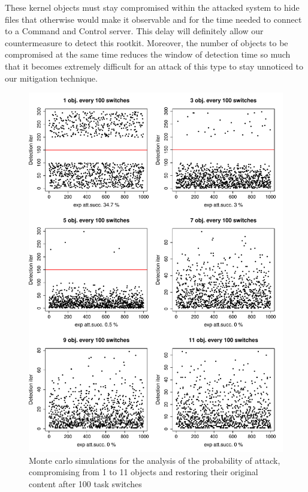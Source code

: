 These kernel objects must stay compromised within the attacked system to hide files that otherwise would make it observable and for the time needed to connect to a Command and Control server. 
This delay will definitely allow our countermeasure to detect this rootkit. Moreover, the number of objects to be compromised at the same time reduces the window of detection time so much that it becomes extremely difficult for an attack of this type to stay unnoticed to our mitigation technique.



\begin{figure}[!htbp]
\begin{center}
\includegraphics[width=130mm]{images/hr_sim_1000}
\caption{{Monte carlo simulations for the analysis of the probability of attack, compromising from 1 to 11 objects and restoring their original content after 100 task switches}}
\label{monteanalysis}
\end{center}
\end{figure}


